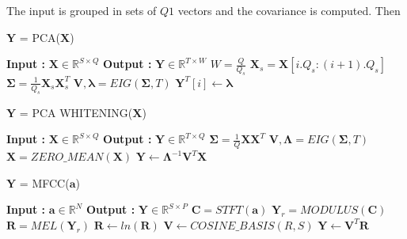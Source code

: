 The input is grouped in sets of $Q1$ vectors and the covariance is computed. Then 



\begin{algorithm}
  \caption{$\textbf{Y}$ = PCA($\textbf{X}$)}\label{PCA}
  \begin{algorithmic}[1]
    \Statex \textbf{Input :} $\textbf{X} \in \mathbb{R}^{S \times Q}$
    \Statex \textbf{Output :} $\textbf{Y} \in \mathbb{R}^{T \times W}$
    \State  $W = \frac{Q}{Q_{s}}$
    \State $\textbf{X}_{s} = \textbf{X}[i.Q_{s}:(i+1).Q_{s}]$ 
      \State $\bm{\Sigma} = \frac{1}{Q_{s}}\textbf{X}_{s}\textbf{X}_{s}^{T}$ 
      \State $\textbf{V}, \bm{\lambda} = EIG(\bm{\Sigma}, T)$ 
      \State $\textbf{Y}^{T}[i] \leftarrow \bm{\lambda}$
    \EndFor
  \end{algorithmic}
\end{algorithm}
\bigskip


\begin{algorithm}
  \caption{$\textbf{Y}$ = PCA WHITENING($\textbf{X}$) }\label{PCA_W}
  \begin{algorithmic}[1]
    \Statex \textbf{Input :} $\textbf{X} \in \mathbb{R}^{S \times Q}$
    \Statex \textbf{Output :} $\textbf{Y} \in \mathbb{R}^{T \times Q}$ 
      \State $\bm{\Sigma} = \frac{1}{Q}\textbf{X}\textbf{X}^{T}$ 
      \State $\textbf{V}, \bm{\Lambda} = EIG(\bm{\Sigma}, T)$ 
      \State $\textbf{\^{X}} = ZERO\_MEAN(\textbf{X})$
      \State $\textbf{Y} \leftarrow \bm{\Lambda}^{-1}\textbf{V}^{T}\textbf{\^{X}}$
  \end{algorithmic}
\end{algorithm}
\bigskip


\begin{algorithm}
  \caption{$\textbf{Y}$ = MFCC($\textbf{a}$) }\label{MFCC}
  \begin{algorithmic}[1]
    \Statex \textbf{Input :} $\textbf{a} \in \mathbb{R}^{N}$
    \Statex \textbf{Output :} $\textbf{Y} \in \mathbb{R}^{S \times P}$ 
    \State $\textbf{C} = STFT(\textbf{a})$ 
    \State $\textbf{Y}_{r} = MODULUS(\textbf{C})$ 
    \State $\textbf{R} = MEL(\textbf{Y}_{r})$ 
    \State $\textbf{R} \leftarrow ln(\textbf{R})$
    \State $\textbf{V} \leftarrow COSINE\_BASIS(R,S)$  
    \State $\textbf{Y} \leftarrow \textbf{V}^{T}\textbf{R}$
  \end{algorithmic}
\end{algorithm}